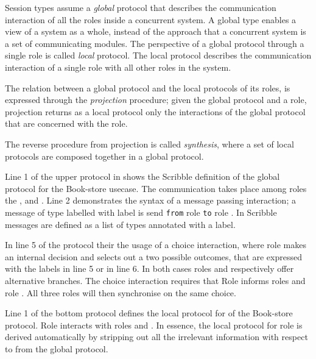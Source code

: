 Session types assume a {\em global} protocol that describes the
communication interaction of all the roles inside a concurrent system.
A global type enables a view of a system as a whole, instead of the 
approach that a concurrent system is a set of communicating modules.
The perspective of a global protocol through a single role
is called {\em local} protocol. The local protocol describes
the communication interaction of a single role with all other roles
in the system.

The relation between a global protocol and the
local protocols of its roles, is expressed
through the {\em projection} procedure;
given the global protocol and a role, projection
returns as a local protocol only the
interactions of the global protocol that are concerned with
the role.

The reverse procedure from projection is called {\em synthesis},
where a set of local protocols are composed together in a global
protocol.




Line 1 of the upper protocol in  shows the
Scribble definition of the global protocol for the Book-store usecase.
The communication takes place
among roles the \BuyerOne, \BuyerTwo and \Seller. Line 2 demonstrates
the syntax of a message passing interaction; a message
of type  labelled with label  is send \lstinline|from|
role \BuyerOne \lstinline|to| role \Seller. In Scribble messages are
defined as a list of types annotated with a label.

In line 5 of the protocol their the usage of a choice interaction,
where role \BuyerTwo makes an internal decision and selects
out a two possible outcomes, that are
expressed with the labels  in line 5 or  in line 6.
In  both cases roles \BuyerOne and \Seller respectively offer
alternative branches. The choice interaction requires that
Role \BuyerTwo informs roles \BuyerOne and role \Seller. All
three roles will then synchronise on the same choice.


Line 1 of the bottom protocol defines the local protocol 
for \BuyerOne of the Book-store protocol. Role \BuyerOne
interacts with roles \BuyerTwo and \Seller. In essence,
the local protocol for role \BuyerOne is derived automatically
by stripping out all the irrelevant information with respect
to \BuyerOne from the global protocol.

